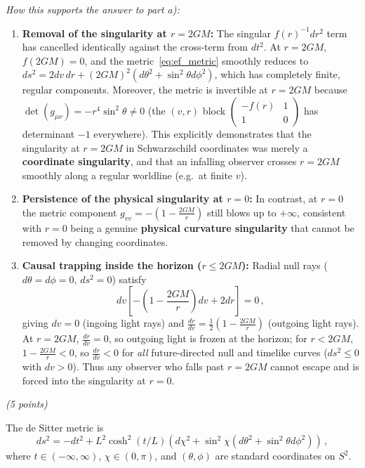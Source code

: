 \documentclass[12pt]{article}
\newcommand{\be}{\begin{equation}}
\newcommand{\ee}{\end{equation}}
\newcounter{quesno}
\newcommand{\ques}[1]{\vspace{2.5em}\stepcounter{quesno}
\noindent{\bf\large Question \thequesno.} \emph{(#1 points)}\par\vspace{0.5em}
}
\begin{document}
\begin{enumerate}[label=\alph*)]
\medskip
\emph{How this supports the answer to part a):}
\begin{enumerate}[label=\roman*.]
\item \textbf{Removal of the singularity at $r = 2GM$:} The singular $f(r)^{-1} dr^2$ term has cancelled identically against the cross-term from $dt^2$. At $r = 2GM$, $f(2GM) = 0$, and the metric~\eqref{eq:ef_metric} smoothly reduces to $ds^2 = 2 dv\, dr + (2GM)^2(d\theta^2 + \sin^2\theta d\phi^2)$, which has completely finite, regular components. Moreover, the metric is invertible at $r = 2GM$ because $\det(g_{\mu\nu}) = -r^4\sin^2\theta \neq 0$ (the $(v,r)$ block $\begin{pmatrix} -f(r) & 1 \\ 1 & 0 \end{pmatrix}$ has determinant $-1$ everywhere). This explicitly demonstrates that the singularity at $r = 2GM$ in Schwarzschild coordinates was merely a \textbf{coordinate singularity}, and that an infalling observer crosses $r = 2GM$ smoothly along a regular worldline (e.g.\ at finite $v$).
\item \textbf{Persistence of the physical singularity at $r = 0$:} In contrast, at $r = 0$ the metric component $g_{vv} = -\left(1 - \frac{2GM}{r}\right)$ still blows up to $+\infty$, consistent with $r = 0$ being a genuine \textbf{physical curvature singularity} that cannot be removed by changing coordinates.
\item \textbf{Causal trapping inside the horizon ($r \le 2GM$):} Radial null rays ($d\theta = d\phi = 0$, $ds^2 = 0$) satisfy
\be
dv \left[ -\left( 1 - \frac{2GM}{r} \right) dv + 2 dr \right] = 0 \,,
\ee
giving $dv = 0$ (ingoing light rays) and $\frac{dr}{dv} = \frac{1}{2}\left(1 - \frac{2GM}{r}\right)$ (outgoing light rays). At $r = 2GM$, $\frac{dr}{dv} = 0$, so outgoing light is frozen at the horizon; for $r < 2GM$, $1 - \frac{2GM}{r} < 0$, so $\frac{dr}{dv} < 0$ for \emph{all} future-directed null and timelike curves ($ds^2 \le 0$ with $dv > 0$). Thus any observer who falls past $r = 2GM$ cannot escape and is forced into the singularity at $r = 0$.
\end{enumerate}
\end{enumerate}


\ques{5}
The de Sitter metric is
\be
ds^2 =- dt^2 +  L^2  \cosh^2 (t/L) \left( d\chi^2 + \sin^2 \chi \left( d\theta^2 + \sin^2\theta d\phi^2 \right)\right)  \,,
\label{eq:dsmetric_ans}
\ee
where $t \in (-\infty, \infty)$, $\chi \in (0,\pi)$, and $(\theta,\phi)$ are standard coordinates on $S^2$.
\end{document}
